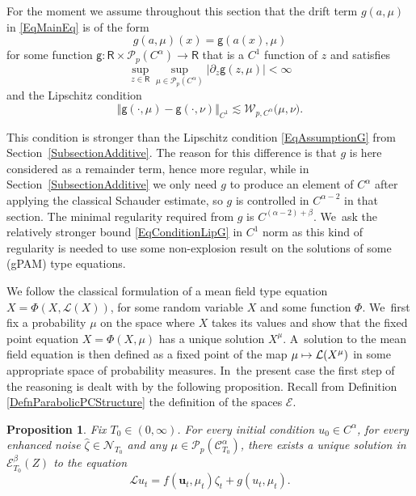 \documentclass[10pt]{amsart}
\newcommand\mto{\mathchoice{\longmapsto}{\mapsto}{\mapsto}{\mapsto}}
\newtheorem{prop}[thm]{Proposition}
\theoremstyle{definition}
\newcommand\bbR{\mathbf{\mathsf{R}}}
\newcommand{\mcE}{\mathcal{E}}
\newcommand{\mcL}{\mathcal{L}}
\newcommand{\mcN}{\mathcal{N}}
\newcommand{\mcP}{\mathcal{P}}
\newcommand\mcW{\mathcal W}
\newcommand{\bsu}{\boldsymbol{u}}
\newcommand{\scrC}{\ensuremath{\mathscr{C}}}
\newcommand{\norme}[1]{\Vert #1 \Vert}
\newcommand{\scrL}{\mathscr{L}}
\begin{document}
For the moment we assume throughout this section that the drift term $g(a,\mu)$ in \eqref{EqMainEq} is of the form
\[
g(a,\mu)(x) = \mathsf{g}(a(x),\mu)
\]
for some function $\mathsf{g} : \bbR\times\mcP_p(C^\alpha)\to\bbR$ that is a $C^1$ function of $z$ and satisfies
\[
\sup_{z\in\bbR}\sup_{\mu\in \mcP_p(C^\alpha)} |\partial_z\mathsf{g}(z,\mu)| < \infty
\]
and the Lipschitz condition
\begin{equation} \label{EqConditionLipG}
\norme{\mathsf{g}(\cdot,\mu) - \mathsf{g}(\cdot,\nu)}_{C^1} \lesssim \mcW_{p,C^\alpha}\bigl(\mu, \nu\bigr).
\end{equation}

This condition is stronger than the Lipschitz condition \eqref{EqAssumptionG} from Section~\ref{SubsectionAdditive}. The reason for this difference is that $g$ is here considered as a remainder term, hence more regular, while in Section~\ref{SubsectionAdditive} we only need $g$ to produce an element of $C^\alpha$ after applying the classical Schauder estimate, so $g$ is controlled in $C^{\alpha-2}$ in that section. The minimal regularity required from $g$ is $C^{(\alpha-2)+\beta}$. We~ask the relatively stronger bound \eqref{EqConditionLipG} in $C^1$ norm as this kind of regularity is needed to use some non-explosion result on the solutions of some (gPAM) type equations.

We follow the classical formulation of a mean field type equation $X=\Phi(X,\mcL(X))$, for some random variable $X$ and some function $\Phi$. We~first fix a probability $\mu$ on the space where $X$ takes its values and show that the fixed point equation $X=\Phi(X,\mu)$ has a unique solution $X^\mu$. A~solution to the mean field equation is then defined as a fixed point of the map $\mu\mto\mcL(X^\mu)$ in some appropriate space of probability measures. In~the present case the first step of the reasoning is dealt with by the following proposition. Recall from Definition \ref{DefnParabolicPCStructure} the definition of the spaces $\mcE$.

\begin{prop} \label{SolPAM1}
Fix $T_0\in(0,\infty)$. For every initial condition $u_0\in C^\alpha$, for every enhanced noise $\widehat \zeta\in{{\boldsymbol{\mcN}}_{T_0}}$ and any $\mu\in \mcP_{p}(\scrC^\alpha_{T_0})$, there exists a unique solution in $\mcE^\beta_{T_0}(Z)$ to the equation
\begin{equation} \label{EqEquationMuFixed}
\scrL u_t = f(\bsu_t,\mu_t)\zeta_t + g(u_t,\mu_t).
\end{equation}
\end{prop}
\end{document}
